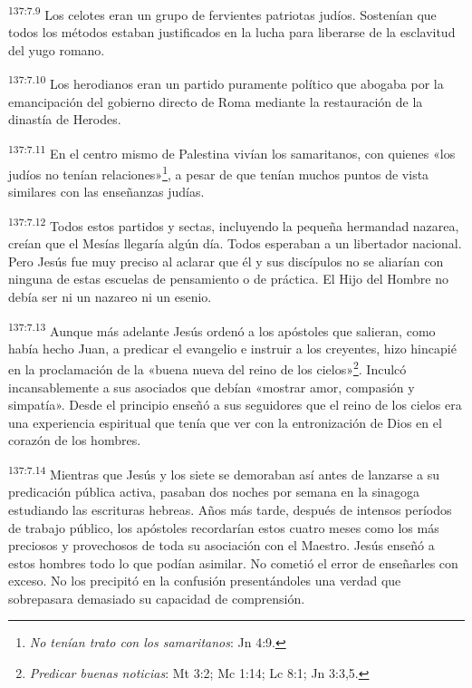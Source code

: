 \par 
\textsuperscript{137:7.9} Los celotes eran un grupo de fervientes patriotas judíos. Sostenían que todos los métodos estaban justificados en la lucha para liberarse de la esclavitud del yugo romano.

\par 
\textsuperscript{137:7.10} Los herodianos eran un partido puramente político que abogaba por la emancipación del gobierno directo de Roma mediante la restauración de la dinastía de Herodes.

\par 
\textsuperscript{137:7.11} En el centro mismo de Palestina vivían los samaritanos, con quienes «los judíos no tenían relaciones»\footnote{\textit{No tenían trato con los samaritanos}: Jn 4:9.}, a pesar de que tenían muchos puntos de vista similares con las enseñanzas judías.

\par 
\textsuperscript{137:7.12} Todos estos partidos y sectas, incluyendo la pequeña hermandad nazarea, creían que el Mesías llegaría algún día. Todos esperaban a un libertador nacional. Pero Jesús fue muy preciso al aclarar que él y sus discípulos no se aliarían con ninguna de estas escuelas de pensamiento o de práctica. El Hijo del Hombre no debía ser ni un nazareo ni un esenio.

\par 
\textsuperscript{137:7.13} Aunque más adelante Jesús ordenó a los apóstoles que salieran, como había hecho Juan, a predicar el evangelio e instruir a los creyentes, hizo hincapié en la proclamación de la «buena nueva del reino de los cielos»\footnote{\textit{Predicar buenas noticias}: Mt 3:2; Mc 1:14; Lc 8:1; Jn 3:3,5.}. Inculcó incansablemente a sus asociados que debían «mostrar amor, compasión y simpatía». Desde el principio enseñó a sus seguidores que el reino de los cielos era una experiencia espiritual que tenía que ver con la entronización de Dios en el corazón de los hombres.

\par 
\textsuperscript{137:7.14} Mientras que Jesús y los siete se demoraban así antes de lanzarse a su predicación pública activa, pasaban dos noches por semana en la sinagoga estudiando las escrituras hebreas. Años más tarde, después de intensos períodos de trabajo público, los apóstoles recordarían estos cuatro meses como los más preciosos y provechosos de toda su asociación con el Maestro. Jesús enseñó a estos hombres todo lo que podían asimilar. No cometió el error de enseñarles con exceso. No los precipitó en la confusión presentándoles una verdad que sobrepasara demasiado su capacidad de comprensión.

